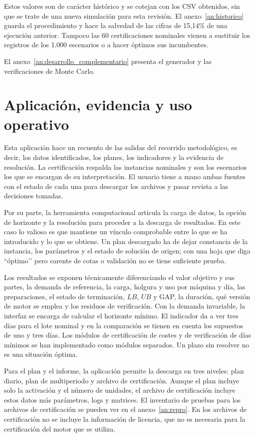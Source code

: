 \documentclass[12pt,a4paper,oneside]{article}
\begin{document}
Estos valores son de carácter histórico y se cotejan con los CSV obtenidos, sin que se trate de una nueva simulación para esta revisión. El anexo~\ref{an:historico} guarda el procedimiento y hace la salvedad de las cifras de 15,14\% de una ejecución anterior. Tampoco las 60 certificaciones nominales vienen a sustituir los registros de los 1.000 escenarios o a hacer óptimos sus incumbentes.

El anexo~\ref{an:desarrollo_complementario} presenta el generador y las verificaciones de Monte Carlo.

\section{Aplicación, evidencia y uso operativo}\label{sec:aplicacion}
Esta aplicación hace un recuento de las salidas del recorrido metodológico, es decir, los datos identificados, los planes, los indicadores y la evidencia de resolución. La certificación respalda las instancias nominales y son los escenarios los que se encargan de su interpretación. El usuario tiene a mano ambas fuentes con el estado de cada una para descargar los archivos y pasar revista a las decisiones tomadas.

Por su parte, la herramienta computacional articula la carga de datos, la opción de horizonte y la resolución para proceder a la descarga de resultados. En este caso lo valioso es que mantiene un vínculo comprobable entre lo que se ha introducido y lo que se obtiene. Un plan descargado ha de dejar constancia de la instancia, los parámetros y el estado de solución de origen; con una hoja que diga ``óptimo’’ pero carente de cotas o validación no se tiene suficiente prueba.

Los resultados se exponen técnicamente diferenciando el valor objetivo y sus partes, la demanda de referencia, la carga, holgura y uso por máquina y día, las preparaciones, el estado de terminación, $LB$, $UB$ y GAP, la duración, qué versión de motor se emplea y los residuos de verificación. Con la demanda invariable, la interfaz se encarga de calcular el horizonte mínimo. El indicador da a ver tres días para el lote nominal y en la comparación se tienen en cuenta los supuestos de uno y tres días. Los módulos de certificación de costes y de verificación de días mínimos se han implementado como módulos separados. Un plazo sin resolver no es una situación óptima.

Para el plan y el informe, la aplicación permite la descarga en tres niveles: plan diario, plan de multiperiodo y archivo de certificación. Aunque el plan incluye solo la activación y el número de unidades, el archivo de certificación incluye estos datos más parámetros, logs y matrices. El inventario de pruebas para los archivos de certificación se pueden ver en el anexo~\ref{an:repro}. En los archivos de certificación no se incluye la información de licencia, que no es necesaria para la certificación del motor que se utiliza.
\end{document}
